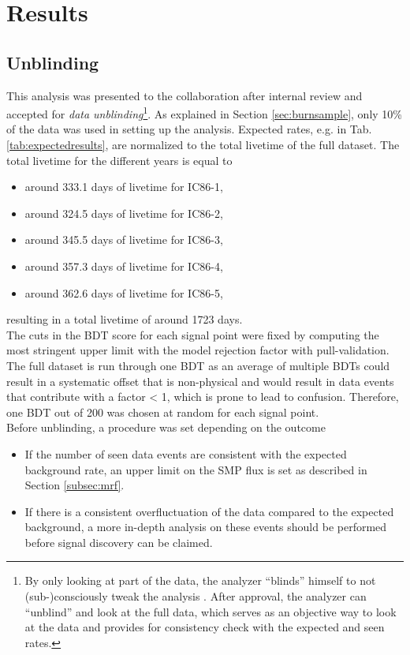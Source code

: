 \section{Results}
\label{sec:results}
\subsection{Unblinding}
This analysis was presented to the collaboration after internal review and accepted for \textit{data unblinding}\footnote{By only looking at part of the data, the analyzer ``blinds'' himself to not (sub-)consciously tweak the analysis \cite{Roodman:2003rw}. After approval, the analyzer can ``unblind'' and look at the full data, which serves as an objective way to look at the data and provides for consistency check with the expected and seen rates.}. As explained in Section \ref{sec:burnsample}, only 10\% of the data was used in setting up the analysis. Expected rates, e.g. in Tab. \ref{tab:expectedresults}, are normalized to the total livetime of the full dataset. The total livetime for the different years is equal to
\vspace{2mm}
\begin{itemize}
\item around 333.1 days of livetime for IC86-1,
\item around 324.5 days of livetime for IC86-2,
\item around 345.5 days of livetime for IC86-3,
\item around 357.3 days of livetime for IC86-4,
\item around 362.6 days of livetime for IC86-5,
\end{itemize}
\vspace{2mm}

\noindent resulting in a total livetime of around 1723 days.\\

\noindent The cuts in the BDT score for each signal point were fixed by computing the most stringent upper limit with the model rejection factor with pull-validation. The full dataset is run through one BDT as an average of multiple BDTs could result in a systematic offset that is non-physical and would result in data events that contribute with a factor < 1, which is prone to lead to confusion. Therefore, one BDT out of 200 was chosen at random for each signal point.\\

\noindent Before unblinding, a procedure was set depending on the outcome 
\vspace{2mm}
\begin{itemize}
\item If the number of seen data events are consistent with the expected background rate, an upper limit on the SMP flux is set as described in Section \ref{subsec:mrf}.
\item If there is a consistent overfluctuation of the data compared to the expected background, a more in-depth analysis on these events should be performed before signal discovery can be claimed.
\end{itemize}
\vspace{2mm}


